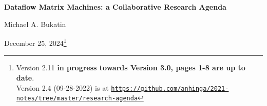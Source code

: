 \documentclass{article}
\begin{document}
\renewcommand{\abstractname}{\vspace{-\baselineskip}}

\renewcommand\contentsname{\vspace{-\baselineskip}}


\begin{center}

{\bf Dataflow Matrix Machines:  a Collaborative Research Agenda}
                                   



\vspace{0.1in}
Michael A. Bukatin


\vspace{0.085in}
December 25, 2024\footnote{Version 2.11 {\bf in progress towards Version 3.0, pages 1-8 are up to date}.\\Version 2.4 (09-28-2022) is at
\href{https://github.com/anhinga/2021-notes/tree/master/research-agenda}
{\tt https://github.com/anhinga/2021-notes/tree/master/research-agenda}}

\end{center}
\end{document}
